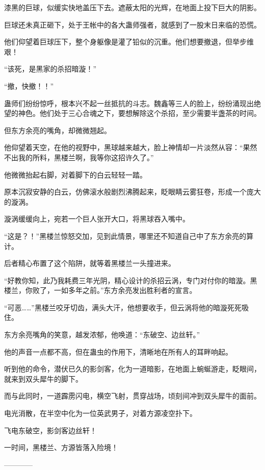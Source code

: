\begin{this_body}
漆黑的巨球，似缓实快地盖压下去。遮蔽太阳的光辉，在地面上投下巨大的阴影。

巨球还未真正砸下，处于王帐中的各大蛊师强者，就感到了一股末日来临的恐慌。

他们仰望着巨球压下，整个身躯像是灌了铅似的沉重。他们想要撤退，但举步维艰！

“该死，是黑家的杀招暗漩！”

“撤，快撤！！”

蛊师们纷纷惊呼，根本兴不起一丝抵抗的斗志。魏鑫等三人的脸上，纷纷涌现出绝望的神色。他们处于三心合魂之下，要想解除这个杀招，至少需要半盏茶的时间。

但东方余亮的嘴角，却微微翘起。

他仰望着天空，在他的视野中，黑球越来越大，脸上神情却一片淡然从容：“果然不出我的所料，黑楼兰啊，我等你这招许久了。”

他微微抬起右脚，对着脚下的白云轻轻一踏。

原本沉寂安静的白云，仿佛滚水般剧烈沸腾起来，眨眼睛云雾狂卷，形成一个庞大的漩涡。

漩涡缓缓向上，宛若一个巨人张开大口，将黑球吞入嘴中。

“这是？！”黑楼兰惊怒交加，见到此情景，哪里还不知道自己中了东方余亮的算计。

后者精心布置了这个陷阱，就等着黑楼兰一头撞进来。

“好教你知，此乃我耗费三年光阴，精心设计的杀招云涡，专门对付你的暗漩。黑楼兰，你败了，一如多年之前。”东方余亮发出胜利者的宣言。

“可恶……”黑楼兰咬牙切齿，满头大汗，他想要收手，但云涡将他的暗漩死死吸住。

东方余亮嘴角的笑意，越发浓郁，他唤道：“东破空、边丝轩。”

他的声音一点都不高，但在蛊虫的作用下，清晰地在所有人的耳畔响起。

听到他的命令，潜伏已久的影剑客，化为一道暗影，在地面上蜿蜒游走，眨眼间，就来到双头犀牛的脚下。

而与此同时，一道霹雳闪电，横空飞射，贯穿战场，顷刻间冲到双头犀牛的面前。

电光消散，在半空中化为一位英武男子，对着方源凌空扑下。

飞电东破空，影剑客边丝轩！

一时间，黑楼兰、方源皆落入险境！

------------

\end{this_body}

